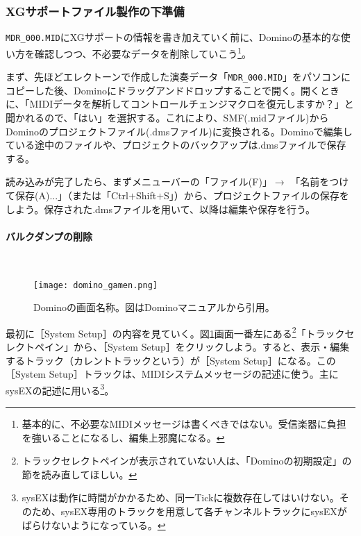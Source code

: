 \documentclass[uplatex, 10pt, dvipdfmx]{jsarticle}
\numberwithin{equation}{section}
\begin{document}
\subsubsection{XGサポートファイル製作の下準備}
\texttt{MDR_000.MID}にXGサポートの情報を書き加えていく前に、Dominoの基本的な使い方を確認しつつ、不必要なデータを削除していこう\footnote{基本的に、不必要なMIDIメッセージは書くべきではない。受信楽器に負担を強いることになるし、編集上邪魔になる。}。

まず、先ほどエレクトーンで作成した演奏データ「\texttt{MDR_000.MID}」をパソコンにコピーした後、Dominoにドラッグアンドドロップすることで開く。開くときに、「MIDIデータを解析してコントロールチェンジマクロを復元しますか？」と聞かれるので、「はい」を選択する。これにより、SMF(.midファイル)からDominoのプロジェクトファイル(.dmsファイル)に変換される。Dominoで編集している途中のファイルや、プロジェクトのバックアップは.dmsファイルで保存する。

読み込みが完了したら、まずメニューバーの「ファイル(F)」$\rightarrow$ 「名前をつけて保存(A)...」（または「Ctrl$+$Shift$+$S」）から、プロジェクトファイルの保存をしよう。保存された.dmsファイルを用いて、以降は編集や保存を行う。

\paragraph{バルクダンプの削除} \ 

\begin{figure}[h]
  \centering
  \texttt{[image: domino\_gamen.png]}
  \caption{Dominoの画面名称。図はDominoマニュアルから引用。}
  \label{figdominogamen}
\end{figure}


最初に［System Setup］の内容を見ていく。図\ref{figdominogamen}画面一番左にある\footnote{トラックセレクトペインが表示されていない人は、「Dominoの初期設定」の節を読み直してほしい。}「トラックセレクトペイン」から、［System Setup］をクリックしよう。すると、表示・編集するトラック（カレントトラックという）が［System Setup］になる。この［System Setup］トラックは、MIDIシステムメッセージの記述に使う。主にsysEXの記述に用いる\footnote{sysEXは動作に時間がかかるため、同一Tickに複数存在してはいけない。そのため、sysEX専用のトラックを用意して各チャンネルトラックにsysEXがばらけないようになっている。}。
\end{document}
